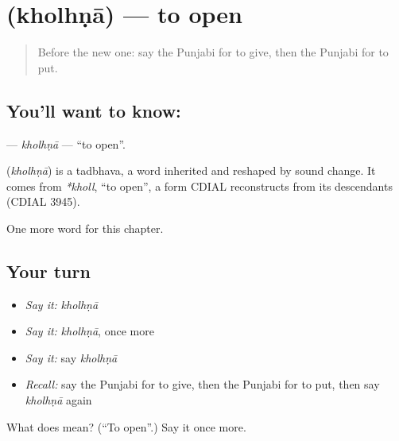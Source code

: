 \section[\texorpdfstring{\pa{ਖੋਲ੍ਹਣਾ} (kholhṇā)}{ਖੋਲ੍ਹਣਾ (kholhṇā)}]{ (kholhṇā) — to open}

\label{lesson:PA-C58-kholhna}



\begin{quote}
Before the new one: say the Punjabi for to give, then the Punjabi for to put.
\end{quote}

\subsection*{You'll want to know: }
\textbf{} — \emph{kholhṇā} — \textquotedblleft{}to open\textquotedblright{}.

\begin{cousinweb}
\textbf{} (\emph{kholhṇā}) is a tadbhava, a word inherited and reshaped by sound change. It comes from \emph{*kholl}, \textquotedblleft{}to open\textquotedblright{}, a form CDIAL reconstructs from its descendants (CDIAL 3945).
\end{cousinweb}

\begin{grammarlens}[title={What you've built}]
One more word for this chapter.
\end{grammarlens}

\subsection*{Your turn}
\begin{itemize}
\raggedright
  \item \emph{Say it:} \emph{kholhṇā}
  \item \emph{Say it:} \emph{kholhṇā}, once more
  \item \emph{Say it:} say \emph{kholhṇā}
  \item \emph{Recall:} say the Punjabi for to give, then the Punjabi for to put, then say \emph{kholhṇā} again
\end{itemize}

\begin{tcolorbox}[breakable,colback=teal!4,colframe=teal!35!black,title={Before you move on}]
What does  mean? (\textquotedblleft{}To open\textquotedblright{}.) Say it once more.
\end{tcolorbox}
